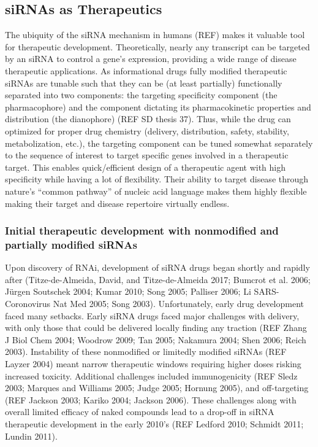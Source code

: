 \documentclass{report}
\begin{document}
\subsection{siRNAs as Therapeutics}

The ubiquity of the siRNA mechanism in humans (REF) makes it valuable tool for therapeutic development. Theoretically, nearly any transcript can be targeted by an siRNA to control a gene’s expression, providing a wide range of disease therapeutic applications. As informational drugs fully modified therapeutic siRNAs are tunable such that they can be (at least partially) functionally separated into two components: the targeting specificity component (the pharmacophore) and the component dictating its pharmacokinetic properties and distribution (the dianophore) (REF SD thesis 37). Thus, while the drug can optimized for proper drug chemistry (delivery, distribution, safety, stability, metabolization, etc.), the targeting component can be tuned somewhat separately to the sequence of interest to target specific genes involved in a therapeutic target. This enables quick/efficient design of a therapeutic agent with high specificity while having a lot of flexibility. Their ability to target disease through nature’s “common pathway” of nucleic acid language makes them highly flexible making their target and disease repertoire virtually endless.


\subsubsection{Initial therapeutic development with nonmodified and partially modified siRNAs}
Upon discovery of RNAi, development of siRNA drugs began shortly and rapidly after (Titze-de-Almeida, David, and Titze-de-Almeida 2017; Bumcrot et al. 2006; Jürgen Soutschek 2004; Kumar 2010; Song 2005; Palliser 2006; Li SARS-Coronovirus Nat Med 2005; Song 2003). Unfortunately, early drug development faced many setbacks. Early siRNA drugs faced major challenges with delivery, with only those that could be delivered locally finding any traction (REF Zhang J Biol Chem 2004; Woodrow 2009; Tan 2005; Nakamura 2004; Shen 2006; Reich 2003). Instability of these nonmodified or limitedly modified siRNAs (REF Layzer 2004) meant narrow therapeutic windows requiring higher doses risking increased toxicity. Additional challenges included immunogenicity (REF Sledz 2003; Marques and Williams 2005; Judge 2005; Hornung 2005), and off-targeting (REF Jackson 2003; Kariko 2004; Jackson 2006). These challenges along with overall limited efficacy of naked compounds lead to a drop-off in siRNA therapeutic development in the early 2010’s (REF Ledford 2010; Schmidt 2011; Lundin 2011).
\end{document}
